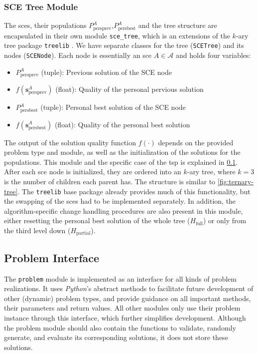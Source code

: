 \subsubsection{SCE Tree Module}

The \glspl{sce}, their populations $P^A_{\text{persprev}}$,$P^A_{\text{persbest}}$ and the tree structure are encapsulated in their own module \texttt{sce\_tree}, which is an extensions of the $k$-ary tree package \texttt{treelib} \cite{chen2018treelib}.
We have separate classes for the tree (\texttt{SCETree}) and its nodes (\texttt{SCENode}). Each node is essentially an \gls{sce} $A \in \mathcal{A}$ and holds four variables:
\begin{itemize}
	\item $P^A_{\text{persprev}}$ (tuple): Previous solution of the SCE node
	\item $f(\mathbf{s}^A_{\text{persprev}})$ (float): Quality of the personal pervious solution
	\item $P^A_{\text{persbest}}$ (tuple): Personal best solution of the SCE node
	\item $f(\mathbf{s}^A_{\text{persbest}})$ (float): Quality of the personal best solution
\end{itemize}

The output of the solution quality function $f(\cdot)$ depends on the provided problem type and module, as well as the initialization of the solutions for the populations. This module and the specific case of the \gls{tsp} is explained in \cref{chap:impl-problem}.
After each \gls{sce} node is initialized, they are ordered into an $k$-ary tree, where $k = 3$ is the number of children each parent has. The structure is similar to \cref{fig:ternary-tree}.
The \texttt{treelib} base package already provides much of this functionality, but the swapping of the \glspl{sce} had to be implemented separately.
In addition, the algorithm-specific change handling procedures are also present in this module, either resetting the personal best solution of the whole tree ($H_{\text{full}}$) or only from the third level down ($H_{\text{partial}}$).

\subsection{Problem Interface}
\label{chap:impl-problem}

The \texttt{problem} module is implemented as an interface for all kinds of problem realizations. It uses \textit{Python}'s abstract methods to facilitate future development of other (dynamic) problem types, and provide guidance on all important methods, their parameters and return values. All other modules only use their problem instance through this interface, which further simplifies development.
Although the problem module should also contain the functions to validate, randomly generate, and evaluate its corresponding solutions, it does not store these solutions.

